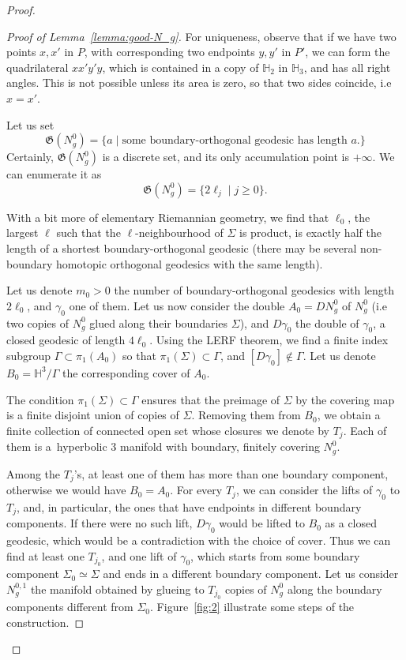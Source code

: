 \documentclass[AHL,Unicode,longabstracts,published]{cedram}
\newcommand{\Hh}{\mathbb{H}}
\newcommand{\fkG}{\mathfrak{G}}
\theoremstyle{plain}
\begin{document}
\begin{proof}
\begin{proof}[Proof of Lemma~\ref{lemma:good-N_g}]
For uniqueness, observe that if we have two points $x,x'$ in $P$, with corresponding two endpoints $y,y'$ in $P'$, we can form the quadrilateral $xx'y'y$, which is contained in a copy of $\Hh_2$ in $\Hh_3$, and has all right angles. This is not possible unless its area is zero, so that two sides coincide, i.e $x=x'$.

Let us set
\[
\fkG(N_g^0)= \{ a \mid \text{some boundary-orthogonal geodesic has length $a$.} \}
\]
Certainly, $\fkG(N_g^0)$ is a discrete set, and its only accumulation point is $+\infty$. We can enumerate it as
\[
\fkG(N_g^0)= \{ 2 \ell_j \mid j\geq 0\}.
\]

With a bit more of elementary Riemannian geometry, we find that $\ell_0$, the largest $\ell$ such that the $\ell$-neighbourhood of $\Sigma$ is product, is exactly half the length of a shortest boundary-orthogonal geodesic (there may be several non-boundary homotopic orthogonal geodesics with the same length).


Let us denote $m_0>0$ the number of boundary-orthogonal geodesics with length $2\ell_0$, and $\gamma_0$ one of them. Let us now consider the double $A_0 = DN_g^0$ of $N_g^0$ (i.e two copies of $N_g^0$ glued along their boundaries $\Sigma$), and $D\gamma_0$ the double of $\gamma_0$, a closed geodesic of length $4\ell_0$. Using the LERF theorem, we find a finite index subgroup $\Gamma\subset \pi_1(A_0)$ so that $\pi_1(\Sigma) \subset \Gamma$, and $[D\gamma_0]\notin \Gamma$. Let us denote $B_0 = \Hh^3/\Gamma$ the corresponding cover of $A_0$.

The condition $\pi_1(\Sigma)\subset \Gamma$ ensures that the preimage of $\Sigma$ by the covering map is a finite disjoint union of copies of $\Sigma$. Removing them from $B_0$, we obtain a finite collection of connected open set whose closures we denote by $T_j$. Each of them is a~hyperbolic 3 manifold with boundary, finitely covering $N_g^0$.

Among the $T_j$'s, at least one of them has more than one boundary component, otherwise we would have $B_0 = A_0$. For every $T_j$, we can consider the lifts of $\gamma_0$ to $T_j$, and, in particular, the ones that have endpoints in different boundary components. If there were no such lift, $D\gamma_0$ would be lifted to $B_0$ as a closed geodesic, which would be a contradiction with the choice of cover. Thus we can find at least one $T_{j_0}$, and one lift of $\gamma_0$, which starts from some boundary component $\Sigma_0 \simeq \Sigma$ and ends in a different boundary component. Let us consider $N_g^{0,1}$ the manifold obtained by glueing to $T_{j_0}$ copies of $N_g^0$ along the boundary components different from $\Sigma_0$. Figure~\ref{fig:2} illustrate some steps of the construction.


\end{proof}
\end{proof}
\end{document}
